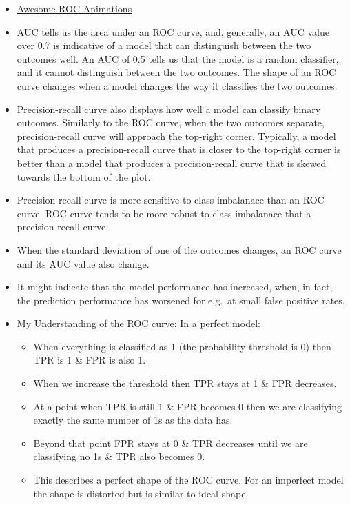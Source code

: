 \documentclass[]{article}
\providecommand{\tightlist}{%
  \setlength{\itemsep}{0pt}\setlength{\parskip}{0pt}}
\begin{document}
\begin{itemize}
\tightlist
\item
  \href{https://github.com/dariyasydykova/open_projects/tree/master/ROC_animation}{Awesome
  ROC Animations}
\item
  AUC tells us the area under an ROC curve, and, generally, an AUC value
  over 0.7 is indicative of a model that can distinguish between the two
  outcomes well. An AUC of 0.5 tells us that the model is a random
  classifier, and it cannot distinguish between the two outcomes. The
  shape of an ROC curve changes when a model changes the way it
  classifies the two outcomes.\\
\item
  Precision-recall curve also displays how well a model can classify
  binary outcomes. Similarly to the ROC curve, when the two outcomes
  separate, precision-recall curve will approach the top-right corner.
  Typically, a model that produces a precision-recall curve that is
  closer to the top-right corner is better than a model that produces a
  precision-recall curve that is skewed towards the bottom of the
  plot.\\
\item
  Precision-recall curve is more sensitive to class imbalanace than an
  ROC curve. ROC curve tends to be more robust to class imbalanace that
  a precision-recall curve.\\
\item
  When the standard deviation of one of the outcomes changes, an ROC
  curve and its AUC value also change.\\
\item
  It might indicate that the model performance has increased, when, in
  fact, the prediction performance has worsened for e.g.~at small false
  positive rates.\\
\item
  My Understanding of the ROC curve: In a perfect model:

  \begin{itemize}
  \tightlist
  \item
    When everything is classified as 1 (the probability threshold is 0)
    then TPR is 1 \& FPR is also 1.\\
  \item
    When we increase the threshold then TPR stays at 1 \& FPR
    decreases.\\
  \item
    At a point when TPR is still 1 \& FPR becomes 0 then we are
    classifying exactly the same number of 1s as the data has.\\
  \item
    Beyond that point FPR stays at 0 \& TPR decreases until we are
    classifying no 1s \& TPR also becomes 0.\\
  \item
    This describes a perfect shape of the ROC curve. For an imperfect
    model the shape is distorted but is similar to ideal shape.
  \end{itemize}
\end{itemize}
\end{document}
